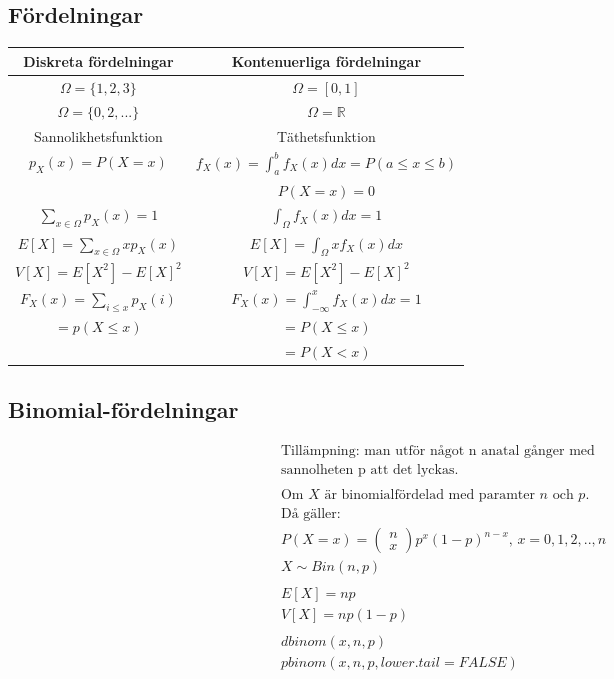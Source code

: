 \begin{multicols}{2}
\section{Fördelningar}
\begin{tabular}{|c|c|}
 \hline
 Diskreta fördelningar & Kontenuerliga fördelningar \\
 \hline
 $\Omega=\{1,2,3\}$      & $\Omega=[0,1]$ \\
 $\Omega=\{0,2,...\}$    & $\Omega=\mathbb{R}$ \\
 \hline
 Sannolikhetsfunktion  & Täthetsfunktion \\
 $p_X(x)=P(X=x)$       & $f_X(x)=\int_a^b f_X(x)dx=P(a\leq{x}\leq{b})$ \\
                       & $P(X=x)=0$ \\
 \hline
 $\sum_{x\in{\Omega}} p_X(x)=1$       & $\int_{\Omega} f_X(x)dx=1$ \\
 \hline
 $E[X]= \sum_{x\in{\Omega}} xp_X(x)$  & $E[X]= \int_{\Omega} xf_X(x)dx$ \\
 \hline
 $V[X]= E[X^2] - E[X]^2$            & $V[X]= E[X^2] - E[X]^2$ \\
 \hline
 $F_X(x)=\sum_{i\leq{x}} p_X(i)$     & $F_X(x)=\int_{-\infty}^x f_X(x)dx=1$ \\
 $      =p(X\leq{x})$               & $     =P(X\leq{x})$ \\
                                    & $     =P(X<x)$ \\
 \hline
\end{tabular}

\subsection{Binomial-fördelningar}
\begin{align*}
  &\text{Tillämpning: man utför något n anatal gånger med} \\
  &\text{sannolheten p att det lyckas.} \\
  &\\
  &\text{Om $X$ är binomialfördelad med paramter $n$ och $p$.} \\
  &\text{Då gäller:} \\
  &P(X=x) = \begin{pmatrix} n \\ x \end{pmatrix} p^x(1-p)^{n-x}, \, x=0,1,2,..,n  \\
  &X \sim Bin(n,p) \\
  &\\
  &E[X]=np \\
  &V[X]=np(1-p) \\
  &\\
  &dbinom(x, n, p) \\
  &pbinom(x, n, p, lower.tail = FALSE) \\
\end{align*}



\end{multicols}
